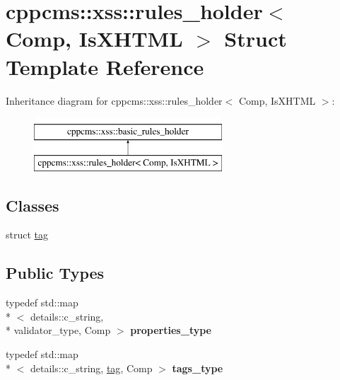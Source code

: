 \hypertarget{structcppcms_1_1xss_1_1rules__holder}{\section{cppcms\-:\-:xss\-:\-:rules\-\_\-holder$<$ Comp, Is\-X\-H\-T\-M\-L $>$ Struct Template Reference}
\label{structcppcms_1_1xss_1_1rules__holder}
}
Inheritance diagram for cppcms\-:\-:xss\-:\-:rules\-\_\-holder$<$ Comp, Is\-X\-H\-T\-M\-L $>$\-:\begin{figure}[H]
\begin{center}
\leavevmode
\includegraphics[height=2.000000cm]{structcppcms_1_1xss_1_1rules__holder}
\end{center}
\end{figure}
\subsection*{Classes}
\begin{DoxyCompactItemize}
\item 
struct \hyperlink{structcppcms_1_1xss_1_1rules__holder_1_1tag}{tag}
\end{DoxyCompactItemize}
\subsection*{Public Types}
\begin{DoxyCompactItemize}
\item 
\hypertarget{structcppcms_1_1xss_1_1rules__holder_a4fbd6ae124d6c566a4d7f12f04e351e2}{typedef std\-::map\\*
$<$ details\-::c\-\_\-string, \\*
validator\-\_\-type, Comp $>$ {\bfseries properties\-\_\-type}}\label{structcppcms_1_1xss_1_1rules__holder_a4fbd6ae124d6c566a4d7f12f04e351e2}

\item 
\hypertarget{structcppcms_1_1xss_1_1rules__holder_a2b80c50c23fe9bea2db15400f0822622}{typedef std\-::map\\*
$<$ details\-::c\-\_\-string, \hyperlink{structcppcms_1_1xss_1_1rules__holder_1_1tag}{tag}, Comp $>$ {\bfseries tags\-\_\-type}}\label{structcppcms_1_1xss_1_1rules__holder_a2b80c50c23fe9bea2db15400f0822622}

\end{DoxyCompactItemize}
